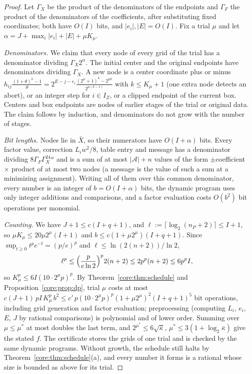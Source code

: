 \begin{proof}
Let $\Gamma_X$ be the product of the denominators of the endpoints and
$\Gamma_F$ the product of the denominators of the coefficients, after
substituting fixed coordinates; both have $O(I)$ bits, and
$|e_i|,|E|=O(I)$. Fix a trial $\mu$ and let $\alpha=J+\max_i|e_i|+|E|+\mu K_\mu$.

\emph{Denominators.} We claim that every node of every grid of the trial has
a denominator dividing $\Gamma_X2^\alpha$. The initial center and the original
endpoints have denominators dividing $\Gamma_X$. A new node is a center
coordinate plus or minus
$h_{ij}\frac{(1+\theta)^k-1}\theta
=2^{E-j-e_i}\frac{(2^\mu+1)^k-2^{\mu k}}{2^{\mu(k-1)}}$ with
$k\le K_\mu+1$ (one extra node detects an abort), or an integer step for
$i\in I_Z$, or a clipped endpoint of the current box. Centers and box
endpoints are nodes of earlier stages of the trial or original data. The
claim follows by induction, and denominators do not grow with the number of
stages.

\emph{Bit lengths.} Nodes lie in $\bar X$, so their numerators have $O(I+\alpha)$
bits. Every factor value, correction $L_iw^2/8$, table entry and message has
a denominator dividing $8\Gamma_F\Gamma_X^24^\alpha$ and is a sum of at most
$|\mathcal A|+n$ values of the form $\pm$coefficient $\times$ product of at
most two nodes (a message is the value of such a sum at a minimizing
assignment). Writing all of them over this common denominator, every number
is an integer of $b=O(I+\alpha)$ bits, the dynamic program uses only integer
additions and comparisons, and a factor evaluation costs $O(b^2)$ bit
operations per monomial.

\emph{Counting.} We have $J+1\le c(I+q+1)$, and
$\ell:=\lceil\log_2(n_P+2)\rceil\le I+1$, so $\mu K_\mu\le20\mu2^\mu(I+1)$ and
$b\le c(1+\mu2^\mu)(I+q+1)$. Since $\sup_{t\ge0}t^pe^{-t}=(p/e)^p$ and
$\ell\le\ln(2(n+2))/\ln2$,
\[
\ell^p\le\Bigl(\frac{p}{e\ln2}\Bigr)^p2(n+2)\le2p^p(n+2)\le6p^pI,
\]
so $K_\mu^p\le6I(10\cdot2^\mu p)^p$. By Theorem~\ref{core:thm:schedule} and
Proposition~\ref{core:prop:dp}, trial $\mu$ costs at most
$c(J+1)\,pI\,K_\mu^p\,b^2\le c'\,p(10\cdot2^\mu p)^p(1+\mu2^\mu)^2(I+q+1)^5$ bit
operations, including grid generation and factor evaluation; preprocessing
(computing $L_i$, $e_i$, $E$, $J$ by rational comparisons) is polynomial and of
lower order. Summing over $\mu\le\mu^*$ at most doubles the last term, and
$2^{\mu^*}\le6\sqrt{\bar\kappa}$, $\mu^*\le3(1+\log_2\bar\kappa)$ give the
stated $f$. The certificate stores the grids of one trial and is checked by
the same dynamic programs. Without growth, the schedule still halts by
Theorem~\ref{core:thm:schedule}(a), and every number it forms is a rational
whose size is bounded as above for its trial.
\end{proof}


